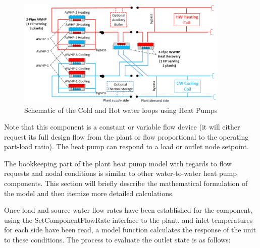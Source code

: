 \begin{figure}[hbtp]
\centering
\includegraphics[width=0.9\textwidth, height=0.9\textheight, keepaspectratio=true]{media/ChillerHeaterPlantLoopEIRSchematic.png}
\caption{Schematic of the Cold and Hot water loops using Heat Pumps \protect \label{fig:schematic-of-the-energyplus-cold-and-hot-plant-loop-heat-pumps}}
\end{figure}

Note that this component is a constant or variable flow device (it will either request its full design flow from the plant or flow proportional to the operating part-load ratio). The heat pump can respond to a load or outlet node setpoint.

The bookkeeping part of the plant heat pump model with regards to flow requests and nodal conditions is similar to other water-to-water heat pump components. This section will briefly describe the mathematical formulation of the model and then itemize more detailed calculations.

Once load and source water flow rates have been established for the component, using the SetComponentFlowRate interface to the plant, and inlet temperatures for each side have been read, a model function calculates the response of the unit to these conditions. The process to evaluate the outlet state is as follows:

